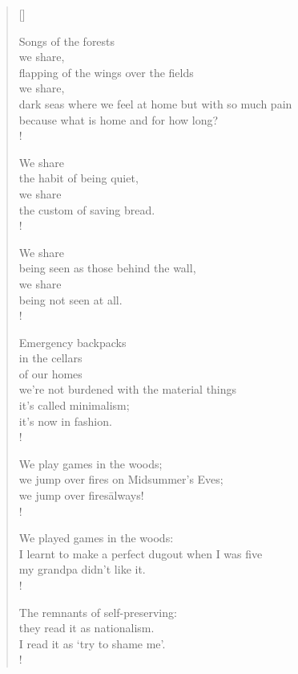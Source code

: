 \begin{verse}[\versewidth]

Songs of the forests\\
\qquad we share,\\
flapping of the wings over the fields\\
\qquad we share,\\
dark seas where we feel at home but with so much pain\=\\
because what is home and for how long?\\!

We share\\
\qquad the habit of being quiet,\\
we share\\
\qquad the custom of saving bread.\\! %

We share\\
\qquad being seen as those behind the wall,\\
we share\\
\qquad being not seen at all.\\!

\vspace*{1cm}

Emergency backpacks\\
in the cellars \\
of our homes\=\\
we're not burdened with the material things\=\\
it's called minimalism;\\
it's now in fashion.\\!

We play games in the woods;\\
we jump over fires on Midsummer's Eves;\\
we jump over fires\=always!\\!

We played games in the woods:\\
I learnt to make a perfect dugout when I was five\=\\
my grandpa didn’t like it.\\!

\clearpage

The remnants of self-preserving:\\
they read it as nationalism.\\
I read it as `try to shame me'.\\!


\end{verse}
